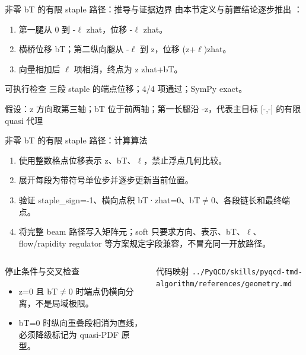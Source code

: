\begin{frame}[t]{非零 bT 的有限 staple 路径：推导与证据边界}
\footnotesize
{}\quad 由本节定义与前置结论逐步推出 ：
\begin{enumerate}
\item 第一腿从 0 到 -\ensuremath{\ell} zhat，位移 -\ensuremath{\ell} zhat。
\item 横桥位移 bT；第二纵向腿从 -\ensuremath{\ell} 到 z，位移 (z+\ensuremath{\ell})zhat。
\item 向量相加后 \ensuremath{\ell} 项相消，终点为 z zhat+bT。
\end{enumerate}\begin{block}{可执行检查}
\quad 三段 staple 的端点位移；4/4 项通过；SymPy exact。
\par\scriptsize 假设：z 方向取第三轴；bT 位于前两轴；第一长腿沿 -z，代表主目标 [-,-] 的有限 quasi 代理
\end{block}
\end{frame}

\begin{frame}[t]{非零 bT 的有限 staple 路径：计算算法}
\footnotesize
{}\begin{enumerate}
\item 使用整数格点位移表示 z、bT、\ensuremath{\ell}，禁止浮点几何比较。
\item 展开每段为带符号单位步并逐步更新当前位置。
\item 验证 staple\_sign=-1、横向点积 bT·zhat=0、bT\ensuremath{\ne}0、各段链长和最终端点。
\item 将完整 beam 路径写入矩阵元；soft 只要求方向、表示、bT、\ensuremath{\ell}、flow/\allowbreak{}rapidity regulator 等方案规定字段兼容，不冒充同一开放路径。
\end{enumerate}\begin{columns}[T,onlytextwidth]
\begin{block}{停止条件与交叉检查}\scriptsize\begin{itemize}
\item[\CheckMark] z=0 且 bT\ensuremath{\ne}0 时端点仍横向分离，不是局域极限。
\item[\CheckMark] bT=0 时纵向重叠段相消为直线，必须降级标记为 quasi-PDF 原型。
\end{itemize}\end{block}
\begin{block}{代码映射}
\scriptsize \texttt{.\allowbreak{}.\allowbreak{}/\allowbreak{}PyQCD/\allowbreak{}skills/\allowbreak{}pyqcd-tmd-algorithm/\allowbreak{}references/\allowbreak{}geometry.\allowbreak{}md}
\end{block}\end{columns}\end{frame}

